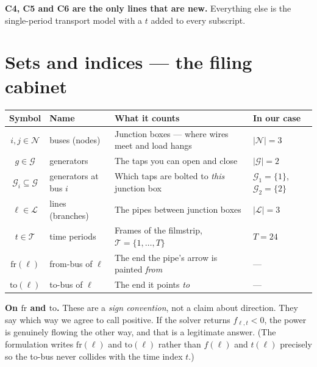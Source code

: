 \documentclass[11pt]{article}
\begin{document}
\noindent
\textcolor{accent}{\textbf{C4, C5 and C6 are the only lines that are new.}} Everything else is
the single-period transport model with a $t$ added to every subscript.

\section{Sets and indices --- the filing cabinet}

\begin{center}
\begin{tabular}{@{}c L{2.9cm} L{8.3cm} L{2.4cm}@{}}
\toprule
\textbf{Symbol} & \textbf{Name} & \textbf{What it counts} & \textbf{In our case} \\
\midrule
$i, j \in \mathcal{N}$ & buses (nodes) & Junction boxes --- where wires meet and load hangs & $|\mathcal{N}| = 3$ \\
$g \in \mathcal{G}$ & generators & The taps you can open and close & $|\mathcal{G}| = 2$ \\
$\mathcal{G}_i \subseteq \mathcal{G}$ & generators at bus $i$ & Which taps are bolted to \emph{this} junction box & $\mathcal{G}_1=\{1\}$, $\mathcal{G}_2=\{2\}$ \\
$\ell \in \mathcal{L}$ & lines (branches) & The pipes between junction boxes & $|\mathcal{L}| = 3$ \\
$t \in \mathcal{T}$ & time periods & Frames of the filmstrip, $\mathcal{T}=\{1,\dots,T\}$ & $T = 24$ \\
$\mathrm{fr}(\ell)$ & from-bus of $\ell$ & The end the pipe's arrow is painted \emph{from} & --- \\
$\mathrm{to}(\ell)$ & to-bus of $\ell$ & The end it points \emph{to} & --- \\
\bottomrule
\end{tabular}
\end{center}

\noindent\textbf{On $\mathrm{fr}$ and $\mathrm{to}$.} These are a \emph{sign convention}, not a
claim about direction. They say which way we agree to call positive. If the solver returns
$f_{\ell,t} < 0$, the power is genuinely flowing the other way, and that is a legitimate answer.
(The formulation writes $\mathrm{fr}(\ell)$ and $\mathrm{to}(\ell)$ rather than $f(\ell)$ and
$t(\ell)$ precisely so the to-bus never collides with the time index $t$.)

\end{document}
